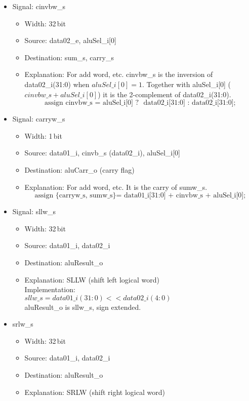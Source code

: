 \begin{itemize}
\begin{itemize}
  \end{itemize}
  \item Signal: cinvbw\_s
  \begin{itemize}
    \item Width: 32\,bit
    \item Source: data02\_e, aluSel\_i[0]
    \item Destination: sum\_s, carry\_s
    \item Explanation: For add word, etc. cinvbw\_s is the inversion of data02\_i(31:0) when $aluSel\_i[0] = 1$. Together with aluSel\_i[0] ($cinvbw\_s + aluSel\_i[0]$) it is the 2-complement of data02\_i(31:0). \[ \mbox{assign cinvbw\_s = aluSel\_i[0] ? ~data02\_i[31:0] : data02\_i[31:0];} \]
  \end{itemize}
  \item Signal: carryw\_s
  \begin{itemize}
    \item Width: 1\,bit
    \item Source: data01\_i, cinvb\_s (data02\_i), aluSel\_i[0]
    \item Destination: aluCarr\_o (carry flag)
    \item Explanation: For add word, etc. It is the carry of sumw\_s. \[ \mbox{assign \{carryw\_s, sumw\_s\}   = data01\_i[31:0] + cinvbw\_s + aluSel\_i[0];} \]
  \end{itemize}
  \item Signal: sllw\_s
  \begin{itemize}
    \item Width: 32\,bit
    \item Source: data01\_i, data02\_i
    \item Destination: aluResult\_o
    \item Explanation: SLLW (shift left logical word) \\ 
    Implementation:\\ 
    $sllw\_s = data01\_i(31:0) << data02\_i(4:0)$ \\
    aluResult\_o is sllw\_s, sign extended.
  \end{itemize}
  \item srlw\_s
  \begin{itemize}
    \item Width: 32\,bit
    \item Source: data01\_i, data02\_i
    \item Destination: aluResult\_o
    \item Explanation: SRLW (shift right logical word) \\

\end{itemize}
\end{itemize}
